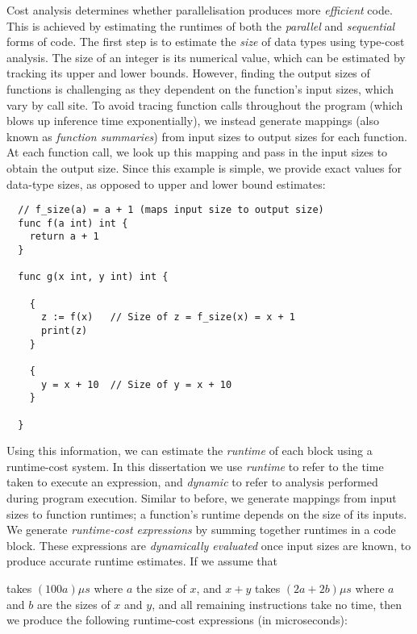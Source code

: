 Cost analysis determines whether parallelisation produces more \textit{efficient} code. This is achieved by estimating the runtimes of both the \textit{parallel} and \textit{sequential} forms of code. The first step is to estimate the \textit{size} of data types using type-cost analysis. The size of an integer is its numerical value, which can be estimated by tracking its upper and lower bounds. However, finding the output sizes of functions is challenging as they dependent on the function's input sizes, which vary by call site. To avoid tracing function calls throughout the program (which blows up inference time exponentially), we instead generate mappings (also known as \textit{function summaries}) from input sizes to output sizes for each function. At each function call, we look up this mapping and pass in the input sizes to obtain the output size. Since this example is simple, we provide exact values for data-type sizes, as opposed to upper and lower bound estimates:

\begin{verbatim}
  // f_size(a) = a + 1 (maps input size to output size)
  func f(a int) int { 
    return a + 1
  }

  func g(x int, y int) int { 

    {
      z := f(x)   // Size of z = f_size(x) = x + 1
      print(z)
    } 

    {
      y = x + 10  // Size of y = x + 10 
    }

  }
\end{verbatim}

Using this information, we can estimate the \textit{runtime} of each block using a runtime-cost system. In this dissertation we use \textit{runtime} to refer to the time taken to execute an expression, and \textit{dynamic} to refer to analysis performed during program execution. Similar to before, we generate mappings from input sizes to function runtimes; a function's runtime depends on the size of its inputs. We generate \textit{runtime-cost expressions} by summing together runtimes in a code block. These expressions are \textit{dynamically evaluated} once input sizes are known, to produce accurate runtime estimates. If we assume that  takes \( (100a) \mu s \) where \( a \) the size of \( x \), and \( x + y \) takes \( (2a + 2b) \mu s \) where \( a \) and \( b \) are the sizes of \( x \) and \( y \), and all remaining instructions take no time, then we produce the following runtime-cost expressions (in microseconds):


